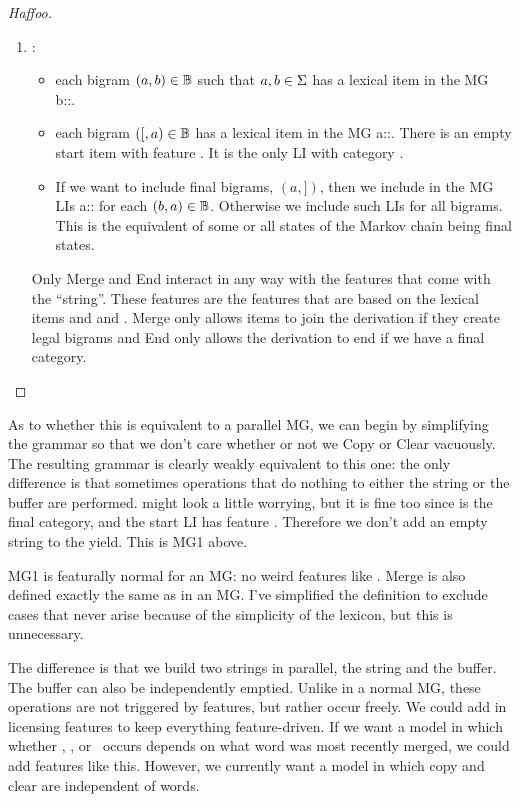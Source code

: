 \documentclass[12pt]{article}
\theoremstyle{definition}
\begin{document}
\begin{proof}[Haffoo]
\begin{enumerate}
\begin{tabular}[H]{p{} | p{}}
    \end{tabular}
    
  \item \BIGR: 
    \begin{itemize}
    \item each bigram $(a,b)\in\mathbb{B}$ such that $a,b\in\Sigma$ has a
      lexical item in the MG b::.
    \item each bigram $({[},a)\in\mathbb{B}$ has a lexical item in the MG a::. There is an empty start item with feature . It is the only LI with category .
    \item If we want to include final bigrams, $(a,{]})$, then we include in the MG LIs a:: for each $(b,a)\in\mathbb{B}$. Otherwise we include such LIs for all bigrams. This is the equivalent of some or all states of the Markov chain being final states.
    \end{itemize}
Only Merge and End interact in any way with the features that come with the ``string''. These features are the features that are based on the lexical items and  and . Merge only allows items to join the derivation if they create legal bigrams and End only allows the derivation to end if we have a final category.

  \end{enumerate}
\end{proof}

As to whether this is equivalent to a parallel MG, we can begin by simplifying the grammar so that we don't care whether or not we Copy or Clear vacuously. The resulting grammar is clearly weakly equivalent to this one: the only difference is that sometimes operations that do nothing to either the string or the buffer are performed. \ed might look a little worrying, but it is fine too since  is the final category, and the start LI has feature . Therefore we don't add an empty string to the yield. This is MG1 above. 

MG1 is featurally normal for an MG: no weird features like . Merge is also defined exactly the same as in an MG. I've simplified the definition to exclude cases that never arise because of the simplicity of the lexicon, but this is unnecessary. 

The difference is that we build two strings in parallel, the string and the buffer. The buffer can also be independently emptied. Unlike in a normal MG, these operations are not triggered by features, but rather occur freely. We could add in licensing features to keep everything feature-driven. If we want a model in which whether \mg, \cp, or \cl~occurs depends on what word was most recently merged, we could add features like this. However, we currently want a model in which copy and clear are independent of words.
\end{document}
